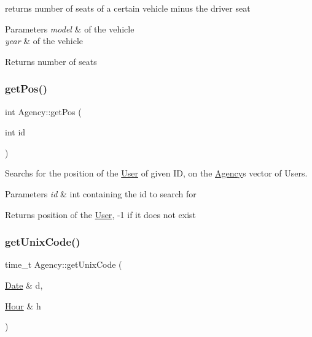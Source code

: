returns number of seats of a certain vehicle minus the driver seat 


\begin{DoxyParams}{Parameters}
{\em model} & of the vehicle \\
\hline
{\em year} & of the vehicle\\
\hline
\end{DoxyParams}
\begin{DoxyReturn}{Returns}
number of seats 
\end{DoxyReturn}
\mbox{\label{class_agency_a7ec884913bb5c9803cc5b71dc4a569d3}} 
\subsubsection{\texorpdfstring{get\+Pos()}{getPos()}}
{\footnotesize\ttfamily int Agency\+::get\+Pos (\begin{DoxyParamCaption}\item[{int}]{id }\end{DoxyParamCaption})}



Searchs for the position of the \hyperlink{class_user}{User} of given ID, on the \hyperlink{class_agency}{Agency}\textquotesingle{}s vector of Users. 


\begin{DoxyParams}{Parameters}
{\em id} & int containing the id to search for\\
\hline
\end{DoxyParams}
\begin{DoxyReturn}{Returns}
position of the \hyperlink{class_user}{User}, -\/1 if it does not exist 
\end{DoxyReturn}
\mbox{\label{class_agency_a00fdbd79de096b13dd0033478552164a}} 
\subsubsection{\texorpdfstring{get\+Unix\+Code()}{getUnixCode()}}
{\footnotesize\ttfamily time\+\_\+t Agency\+::get\+Unix\+Code (\begin{DoxyParamCaption}\item[{\hyperlink{class_date}{Date} \&}]{d,  }\item[{\hyperlink{class_hour}{Hour} \&}]{h }\end{DoxyParamCaption})}



